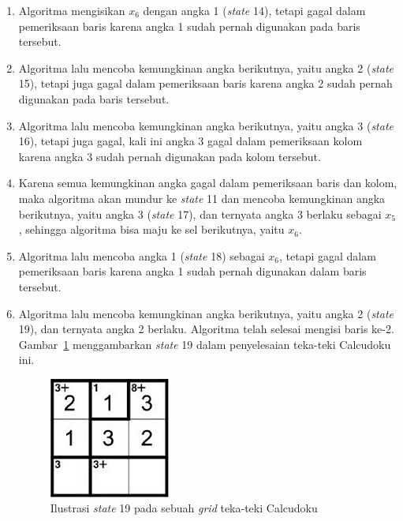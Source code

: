 \begin{enumerate}
\item Algoritma mengisikan \begin{math}x_6\end{math} dengan angka 1 (\textit{state} 14), tetapi gagal dalam pemeriksaan baris karena angka 1 sudah pernah digunakan pada baris tersebut.
\item Algoritma lalu mencoba kemungkinan angka berikutnya, yaitu angka 2 (\textit{state} 15), tetapi juga gagal dalam pemeriksaan baris karena angka 2 sudah pernah digunakan pada baris tersebut.
\item Algoritma lalu mencoba kemungkinan angka berikutnya, yaitu angka 3 (\textit{state} 16), tetapi juga gagal, kali ini angka 3 gagal dalam pemeriksaan kolom karena angka 3 sudah pernah digunakan pada kolom tersebut.
\item Karena semua kemungkinan angka gagal dalam pemeriksaan baris dan kolom, maka algoritma akan mundur ke \textit{state} 11 dan mencoba kemungkinan angka berikutnya, yaitu angka 3 (\textit{state} 17), dan ternyata angka 3 berlaku sebagai \begin{math}x_5\end{math}, sehingga algoritma bisa maju ke sel berikutnya, yaitu \begin{math}x_6\end{math}.
\item Algoritma lalu mencoba angka 1 (\textit{state} 18) sebagai \begin{math}x_6\end{math}, tetapi gagal dalam pemeriksaan baris karena angka 1 sudah pernah digunakan dalam baris tersebut.
\item Algoritma lalu mencoba kemungkinan angka berikutnya, yaitu angka 2 (\textit{state} 19), dan ternyata angka 2 berlaku. Algoritma telah selesai mengisi baris ke-2. Gambar~\ref{fig:backtracking6} menggambarkan \textit{state} 19 dalam penyelesaian teka-teki Calcudoku ini.

\begin{figure}
\centering
\captionsetup{justification=centering}
\includegraphics[scale=1]{Gambar/Backtracking6}
\caption[Ilustrasi \textit{state} 19 pada sebuah \textit{grid} teka-teki Calcudoku ~\cite{fahda:16:backtracking}]{Ilustrasi \textit{state} 19 pada sebuah \textit{grid} teka-teki Calcudoku  ~\cite{fahda:16:backtracking}}
\label{fig:backtracking6}
\end{figure}


\end{enumerate}
